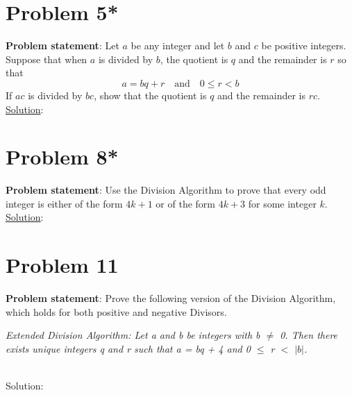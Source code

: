 \documentclass{article} %
\begin{document}

\section*{Problem 5*}

\textbf{Problem statement}:
Let $a$ be any integer and let $b$ and $c$ be positive integers.  Suppose that when $a$ is divided by $b$, the quotient is $q$ and the remainder is $r$ so that 
\[a = bq + r     \quad \textrm{and} \quad      0 \leq r < b\]
If $ac$ is divided by $bc$, show that the quotient is $q$ and the remainder is $rc$.
\\


\underline{Solution}: 
\begin{addmargin}[1em]{0em}

\end{addmargin}



\section*{Problem 8*}

\textbf{Problem statement}: 
Use the Division Algorithm to prove that every odd integer is either of the form $4k + 1$ or of the form $4k + 3$ for some integer $k$.
\\

\underline{Solution}: 
\begin{addmargin}[1em]{0em}

\end{addmargin}


\section*{Problem 11}

\textbf{Problem statement}:
Prove the following version of the Division Algorithm, which holds for both positive and negative Divisors.
\\ \begin{addmargin}[1em]{0em}
\textit{Extended Division Algorithm: Let a and b be integers with b $\neq$ 0.  Then there exists unique integers q and r such that a = bq + 4 and 0 $\leq$ r $<$ $|b|$.}
\end{addmargin} \hfill {}
\\


Solution: 
\begin{addmargin}[1em]{0em}

\end{addmargin}

\end{document}
